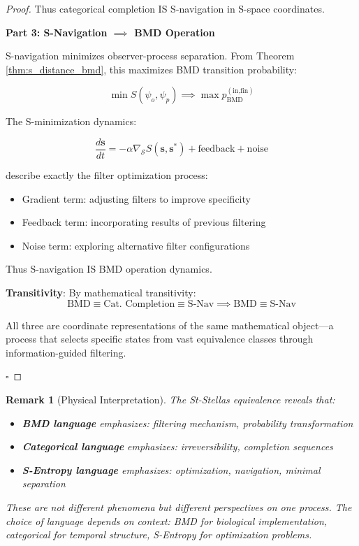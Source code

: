\documentclass[12pt,a4paper]{article}
\newtheorem{remark}[theorem]{Remark}
\begin{document}
\begin{proof}
Thus categorical completion IS S-navigation in S-space coordinates.

\textbf{Part 3: S-Navigation $\implies$ BMD Operation}

S-navigation minimizes observer-process separation. From Theorem \ref{thm:s_distance_bmd}, this maximizes BMD transition probability:

\begin{equation}
\min S(\psi_o, \psi_p) \implies \max p_{\text{BMD}}^{(\text{in,fin})}
\end{equation}

The S-minimization dynamics:

\begin{equation}
\frac{d\mathbf{s}}{dt} = -\alpha \nabla_{\mathcal{S}} S(\mathbf{s}, \mathbf{s}^*) + \text{feedback} + \text{noise}
\end{equation}

describe exactly the filter optimization process:

\begin{itemize}
\item Gradient term: adjusting filters to improve specificity
\item Feedback term: incorporating results of previous filtering
\item Noise term: exploring alternative filter configurations
\end{itemize}

Thus S-navigation IS BMD operation dynamics.

\textbf{Transitivity}: By mathematical transitivity:
\begin{equation}
\text{BMD} \equiv \text{Cat. Completion} \equiv \text{S-Nav} \implies \text{BMD} \equiv \text{S-Nav}
\end{equation}

All three are coordinate representations of the same mathematical object—a process that selects specific states from vast equivalence classes through information-guided filtering.

$\square$
\end{proof}

\begin{remark}[Physical Interpretation]
The St-Stellas equivalence reveals that:
\begin{itemize}
\item \textbf{BMD language} emphasizes: filtering mechanism, probability transformation
\item \textbf{Categorical language} emphasizes: irreversibility, completion sequences
\item \textbf{S-Entropy language} emphasizes: optimization, navigation, minimal separation
\end{itemize}
These are not different phenomena but different perspectives on one process. The choice of language depends on context: BMD for biological implementation, categorical for temporal structure, S-Entropy for optimization problems.
\end{remark}
\end{document}
